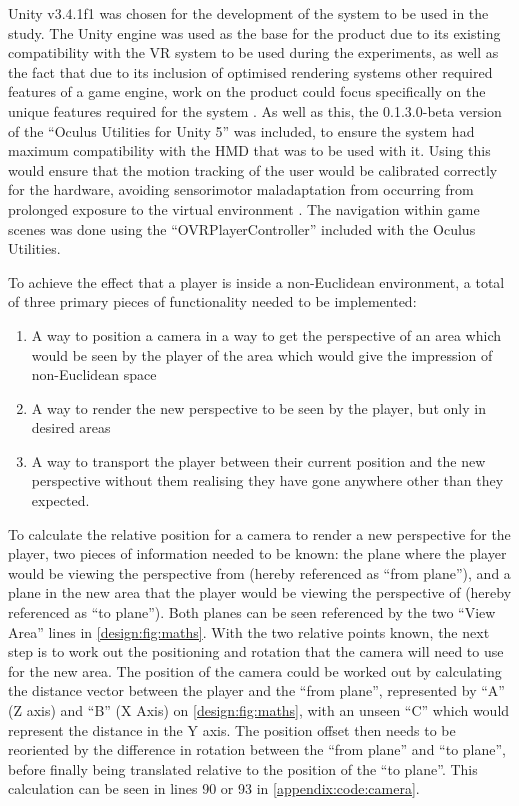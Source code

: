 		Unity v3.4.1f1 \cite{UnityTechnologies2016} was chosen for the development of the system to be used in the study.
		The Unity engine was used as the base for the product due to its existing compatibility with the VR system to be used during the experiments, as well as the fact that due to its inclusion of optimised rendering systems other required features of a game engine, work on the product could focus specifically on the unique features required for the system \cite{Bruce2012}.
		As well as this, the 0.1.3.0-beta version of the \enquote{Oculus Utilities for Unity 5} \cite{Oculus2016} was included, to ensure the system had maximum compatibility with the HMD that was to be used with it.
		Using this would ensure that the motion tracking of the user would be calibrated correctly for the hardware, avoiding sensorimotor maladaptation from occurring from prolonged exposure to the virtual environment \cite{Wright2014}.
		The navigation within game scenes was done using the \enquote{OVRPlayerController} included with the Oculus Utilities.

		To achieve the effect that a player is inside a non-Euclidean environment, a total of three primary pieces of functionality needed to be implemented:
		\begin{enumerate}
			\item A way to position a camera in a way to get the perspective of an area which would be seen by the player of the area which would give the impression of non-Euclidean space
			\item A way to render the new perspective to be seen by the player, but only in desired areas
			\item A way to transport the player between their current position and the new perspective without them realising they have gone anywhere other than they expected.
		\end{enumerate}

		To calculate the relative position for a camera to render a new perspective for the player, two pieces of information needed to be known: the plane where the player would be viewing the perspective from (hereby referenced as \enquote{from plane}), and a plane in the new area that the player would be viewing the perspective of (hereby referenced as \enquote{to plane}). Both planes can be seen referenced by the two \enquote{View Area} lines in \autoref{design:fig:maths}.
		With the two relative points known, the next step is to work out the positioning and rotation that the camera will need to use for the new area.
		The position of the camera could be worked out by calculating the distance vector between the player and the \enquote{from plane}, represented by \enquote{A} (Z axis) and \enquote{B} (X Axis) on \autoref{design:fig:maths}, with an unseen \enquote{C} which would represent the distance in the Y axis.
		The position offset then needs to be reoriented by the difference in rotation between the \enquote{from plane} and \enquote{to plane}, before finally being translated relative to the position of the \enquote{to plane}.
		This calculation can be seen in lines 90 or 93 in \autoref{appendix:code:camera}.

